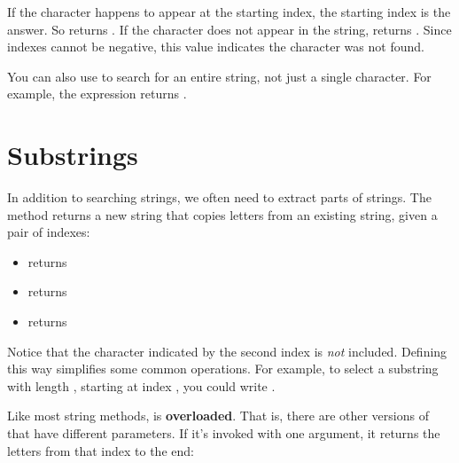 
If the character happens to appear at the starting index, the starting index is the answer.
So  returns .
If the character does not appear in the string,  returns .
Since indexes cannot be negative, this value indicates the character was not found.

You can also use  to search for an entire string, not just a single character.
For example, the expression  returns .


\section{Substrings}


In addition to searching strings, we often need to extract parts of strings.
The  method returns a new string that copies letters from an existing string, given a pair of indexes:

\begin{itemize}
\item {} returns 
\item {} returns 
\item {} returns 
\end{itemize}

Notice that the character indicated by the second index is {\em not} included.
Defining  this way simplifies some common operations.
For example, to select a substring with length , starting at index , you could write .


Like most string methods,  is {\bf overloaded}.
That is, there are other versions of  that have different parameters.
If it's invoked with one argument, it returns the letters from that index to the end:

